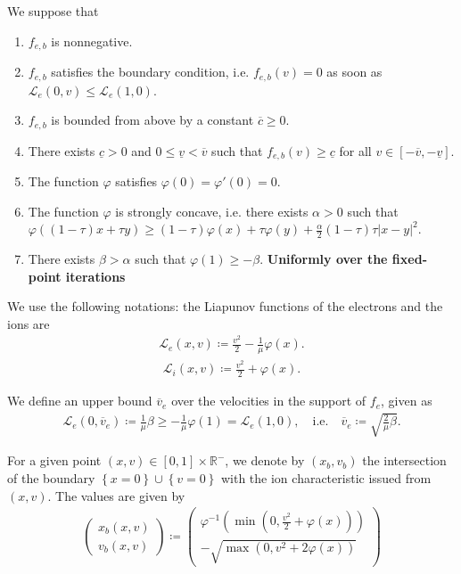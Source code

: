 \documentclass{article}
\numberwithin{equation}{section}
\newcommand{\todo}[1]{{\color{red}\textbf{#1}}}
\newcommand{\vv}[1]{\begin{pmatrix} #1 \end{pmatrix}} %
\newcommand{\ve}{{\overline{v}_e}} %
\newcommand{\domfel}{{\underline{v}}} %
\newcommand{\domfeu}{{\overline{v}}} %
\newcommand{\minfe}{{\underline{c}}} %
\newcommand{\maxfe}{{\overline{c}}} %
\begin{document}
We suppose that 
\begin{enumerate}
\item $f_{e,b}$ is nonnegative.
\item $f_{e,b}$ satisfies the boundary condition, i.e. $f_{e,b}(v) = 0$ as soon as $\mathcal{L}_e(0,v) \leqslant \mathcal{L}_e(1,0)$.
\item $f_{e,b}$ is bounded from above by a constant $\maxfe \geqslant 0$.
\item There exists $\minfe > 0$ and $0 \leqslant \domfel < \domfeu$ such that $f_{e,b}(v) \geqslant \minfe$ for all $v\in[-\domfeu,-\domfel]$.
\item The function $\varphi$ satisfies $\varphi(0)=\varphi'(0)=0$.
\item The function $\varphi$ is strongly concave, i.e. there exists $\alpha>0$ such that $\varphi((1-\tau) x + \tau y) \geqslant (1-\tau) \varphi(x)+\tau \varphi(y) + \frac{\alpha}{2} (1-\tau)\tau \left|x-y\right|^2$.
\item There exists $\beta > \alpha$ such that $\varphi(1) \geqslant - \beta$. \todo{Uniformly over the fixed-point iterations}
\end{enumerate}

We use the following notations: the Liapunov functions of the electrons and the ions are
\begin{align}\label{eq:def_Le}
	\mathcal{L}_e(x,v) \coloneqq \frac{v^2}{2} - \frac{1}{\mu} \varphi(x).
\end{align}
\begin{align}\label{eq:def_Li}
	\mathcal{L}_i(x,v) \coloneqq \frac{v^2}{2} + \varphi(x).
\end{align}

We define an upper bound $\ve$ over the velocities in the support of $f_e$, given as
\begin{align}\label{eq:def_ve}
	\mathcal{L}_e(0,\ve) \coloneqq \frac{1}{\mu} \beta \geqslant -\frac{1}{\mu}\varphi(1) = \mathcal{L}_e(1,0), \quad\text{i.e.}\quad \ve \coloneqq \sqrt{\frac{2}{\mu}\beta}.
\end{align}

For a given point $(x,v) \in [0,1]\times \mathbb{R}^{-}$, we denote by $(x_b, v_b)$ the intersection of the boundary $\left\{x=0\right\} \cup \left\{v=0\right\}$ with the ion characteristic issued from $(x,v)$. The values are given by
\begin{align}\label{eq:def_xb_vb}
	\vv{x_b(x,v) \\ v_b(x,v)} \coloneqq \vv{\varphi^{-1}\left(\min\left(0,\frac{v^2}{2} + \varphi(x)\right)\right) \\ - \sqrt{\max\left(0,v^2 + 2\varphi(x)\right)}}
\end{align}
\end{document}
